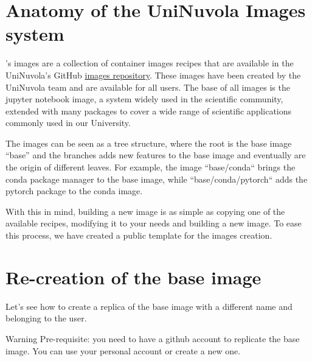 \section{Anatomy of the UniNuvola Images system}\label{image_anatomy}
\uninuvola's images are a collection of container images recipes that are
available in the UniNuvola's GitHub \href{https://github.com/UniNuvola/images}
{images repository}. 
These images have been created by the UniNuvola team and are available for all users.
The base of all images is the jupyter notebook image, a system widely used in the
scientific community, extended with many packages to cover a wide range of
scientific applications commonly used in our University.

The images can be seen as a tree structure, where the root is the base image
``base'' and the branches adds new features to the base image and eventually 
are the origin of different leaves. 
For example, the image ``base/conda`` brings the conda package manager to the base
image, while ``base/conda/pytorch`` adds the pytorch package to the conda image.

With this in mind, building a new image is as simple as copying one of the
available recipes, modifying it to your needs and building a new image.
To ease this process, we have created a public template for the images creation.

\section{Re-creation of the base image}\label{image_recreation}
Let's see how to create a replica of the base image with a different name and belonging to the user.

\begin{bclogo}[logo=\bcinfo, couleurBarre=orange, noborder=true, couleur=white]{Warning}
  Pre-requisite: you need to have a github account to replicate the base
  image. You can use your personal account or create a new one.
\end{bclogo}

